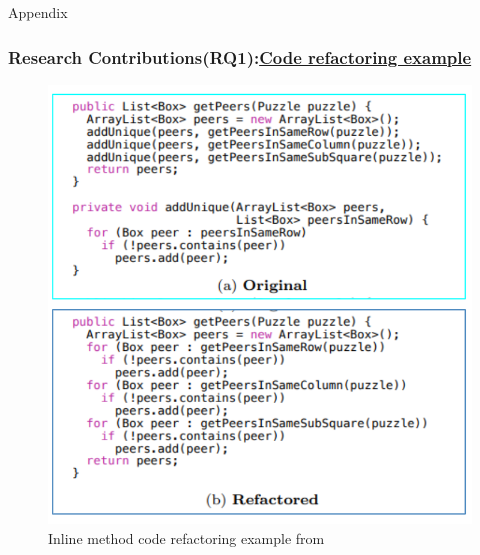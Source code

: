 \documentclass{beamer}
\begin{document}
\begin{frame}{Appendix}
\hypertarget{codeRefactorSlide}{}
  \frametitle{Research Contributions(RQ1):\hyperlink{back} {Code refactoring example} }
  \begin{figure}[t]
    \begin{minipage}[t]{0.45\textwidth}
        \raggedleft
        \includegraphics[width=\textwidth]{figures/Slide_13_2(Inline code refactoring example).png}
        \captionsetup{singlelinecheck=false, justification=centering}
        \caption{\small Inline method code refactoring example from \cite{sahin2014code}}
        \label{fig:Inline code refactoring example}
    \end{minipage}
\end{figure}

\end{frame}
\end{document}
